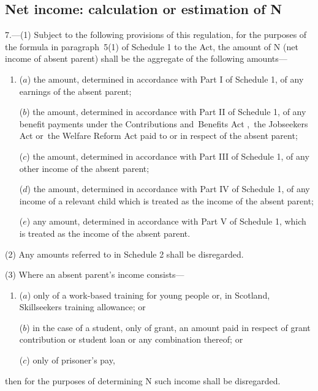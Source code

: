 \documentclass[12pt,a4paper]{article}
\begin{document}
\subsection[7. Net income: calculation or estimation of N]{Net income: calculation or estimation of N}

7.—(1) Subject to the following provisions of this regulation, for the purposes of the formula in paragraph~5(1) of Schedule 1 to the Act, the amount of N (net income of absent parent) shall be the aggregate of the following amounts—
\begin{enumerate}\item[]
($a$) the amount, determined in accordance with Part I of Schedule 1, of any earnings of the absent parent;

($b$) the amount, determined in accordance with Part II of Schedule 1, of any benefit payments under the Contributions and~Benefits Act%
,~the Jobseekers Act or~the Welfare Reform Act  %
paid to or in respect of the absent parent;

($c$) the amount, determined in accordance with Part III of Schedule 1, of any other income of the absent parent;

($d$) the amount, determined in accordance with Part IV of Schedule 1, of any income of a relevant child which is treated as the income of the absent parent;

($e$) any amount, determined in accordance with Part V of Schedule 1, which is treated as the income of the absent parent.
\end{enumerate}

(2) Any amounts referred to in Schedule 2 shall be disregarded.

(3) Where an absent parent’s income consists—
\begin{enumerate}\item[]
($a$) only of a 
work-based training for young people or, in Scotland, Skillseekers training  %
allowance; or

($b$) in the case of a student, only of grant, an amount paid in respect of grant contribution or student loan or any combination thereof; or

($c$) only of prisoner’s pay,
\end{enumerate}
then for the purposes of determining N such income shall be disregarded.
\end{document}
